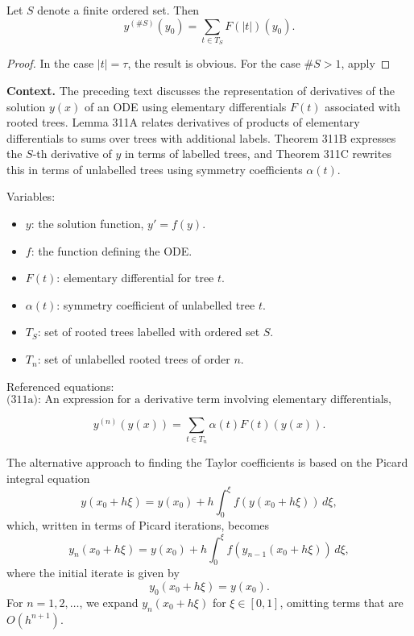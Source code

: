 \begin{theorem}

  \label{thm:311B}
Let $S$ denote a finite ordered set. Then
\[
y^{(\#S)}(y_0) = \sum_{t \in T_S} F(|t|)(y_0).
\]
\end{theorem}

\begin{proof}
In the case $|t| = \tau$, the result is obvious. For the case $\#S > 1$, apply
\end{proof}

\noindent\textbf{Context.}
The preceding text discusses the representation of derivatives of the solution $y(x)$ of an ODE using elementary differentials $F(t)$ associated with rooted trees. Lemma 311A relates derivatives of products of elementary differentials to sums over trees with additional labels. Theorem 311B expresses the $S$-th derivative of $y$ in terms of labelled trees, and Theorem 311C rewrites this in terms of unlabelled trees using symmetry coefficients $\alpha(t)$.

Variables:
\begin{itemize}
    \item $y$: the solution function, $y' = f(y)$.
    \item $f$: the function defining the ODE.
    \item $F(t)$: elementary differential for tree $t$.
    \item $\alpha(t)$: symmetry coefficient of unlabelled tree $t$.
    \item $T_S$: set of rooted trees labelled with ordered set $S$.
    \item $T_n$: set of unlabelled rooted trees of order $n$.
\end{itemize}

Referenced equations:
\begin{equation}
    \text{(311a): An expression for a derivative term involving elementary differentials, used in Lemma 311A.}
\end{equation}

\begin{theorem}

  \label{thm:311C}
\[
y^{(n)}(y(x)) = \sum_{t \in T_n} \alpha(t) F(t)(y(x)).
\]

The alternative approach to finding the Taylor coefficients is based on the Picard integral equation
\[
y(x_0 + h\xi) = y(x_0) + h \int_0^\xi f(y(x_0 + h\xi)) \, d\xi,
\]
which, written in terms of Picard iterations, becomes
\[
y_n(x_0 + h\xi) = y(x_0) + h \int_0^\xi f(y_{n-1}(x_0 + h\xi)) \, d\xi, \tag{311b}
\]
where the initial iterate is given by
\[
y_0(x_0 + h\xi) = y(x_0). \tag{311c}
\]
For $n = 1, 2, \dots$, we expand $y_n(x_0 + h\xi)$ for $\xi \in [0, 1]$, omitting terms that are $O(h^{n+1})$.
\end{theorem}

